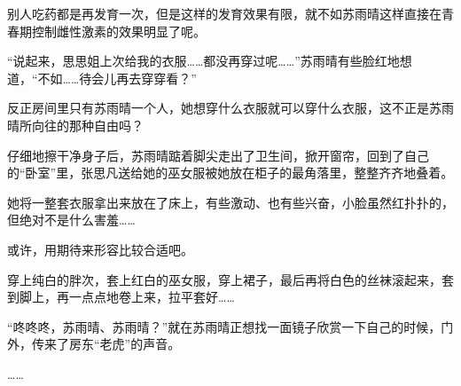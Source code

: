 别人吃药都是再发育一次，但是这样的发育效果有限，就不如苏雨晴这样直接在青春期控制雌性激素的效果明显了呢。

“说起来，思思姐上次给我的衣服……都没再穿过呢……”苏雨晴有些脸红地想道，“不如……待会儿再去穿穿看？”

反正房间里只有苏雨晴一个人，她想穿什么衣服就可以穿什么衣服，这不正是苏雨晴所向往的那种自由吗？

仔细地擦干净身子后，苏雨晴踮着脚尖走出了卫生间，掀开窗帘，回到了自己的“卧室”里，张思凡送给她的巫女服被她放在柜子的最角落里，整整齐齐地叠着。

她将一整套衣服拿出来放在了床上，有些激动、也有些兴奋，小脸虽然红扑扑的，但绝对不是什么害羞……

或许，用期待来形容比较合适吧。

穿上纯白的胖次，套上红白的巫女服，穿上裙子，最后再将白色的丝袜滚起来，套到脚上，再一点点地卷上来，拉平套好……

“咚咚咚，苏雨晴、苏雨晴？”就在苏雨晴正想找一面镜子欣赏一下自己的时候，门外，传来了房东“老虎”的声音。

……
